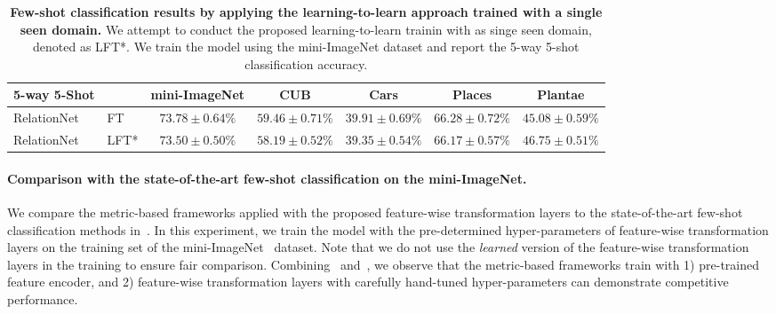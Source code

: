 \begin{table}[t]\scriptsize
	\centering
	\caption{\textbf{Few-shot classification results by applying the learning-to-learn approach trained with a single seen domain.} We attempt to conduct the proposed learning-to-learn trainin with as singe seen domain, denoted as LFT*. We train the model using the mini-ImageNet dataset and report the 5-way 5-shot classification accuracy.}
	\begin{tabular}{ll|c|cccc} 
	    \toprule
	    5-way 5-Shot &  & mini-ImageNet & CUB & Cars & Places & Plantae\\
		\midrule
		RelationNet & FT & $73.78 \pm 0.64\%$ & $59.46 \pm 0.71\%$ & $39.91 \pm 0.69\%$ & $66.28 \pm 0.72\%$ & $45.08 \pm 0.59\%$\\
		RelationNet & LFT* & $73.50 \pm 0.50\%$ & $58.19 \pm 0.52\%$ & $39.35 \pm 0.54\%$ & $66.17 \pm 0.57\%$ & $46.75 \pm 0.51\%$\\
		\bottomrule 
	\end{tabular}
	\label{tab:l2lsingle}
\end{table}



\paragraph{Comparison with the state-of-the-art few-shot classification on the mini-ImageNet.}
We compare the metric-based frameworks applied with the proposed feature-wise transformation layers to the state-of-the-art few-shot classification methods in~.
In this experiment, we train the model with the pre-determined hyper-parameters of feature-wise transformation layers on the training set of the mini-ImageNet~\citep{ravi2017metalstm} dataset.
Note that we do not use the \emph{learned} version of the feature-wise transformation layers in the training to ensure fair comparison.
Combining~ and~, we observe that the metric-based frameworks train with 1) pre-trained feature encoder, and 2) feature-wise transformation layers with carefully hand-tuned hyper-parameters can demonstrate competitive performance.


